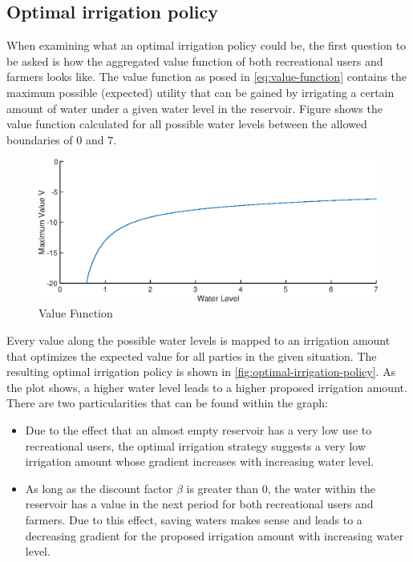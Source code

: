 \documentclass[12pt, a4paper, oneside]{article}
\begin{document}
\subsection{Optimal irrigation policy}
When examining what an optimal irrigation policy could be, the first question to be asked is how the aggregated value function of both recreational users and farmers looks like. 
The value function as posed in \ref{eq:value-function} contains the maximum possible (expected) utility that can be gained by irrigating a certain amount of water under a given water level in the reservoir. 
Figure  shows the value function calculated for all possible water levels between the allowed boundaries of $0$ and $7$. 
\begin{figure}[ht]
	\includegraphics[width=1\textwidth]{figures/value_function.eps}
	\caption{Value Function}
	\label{fig:value-function}
\end{figure}
\newline
Every value along the possible water levels is mapped to an irrigation amount that optimizes the expected value for all parties in the given situation. 
The resulting optimal irrigation policy is shown in \ref{fig:optimal-irrigation-policy}. 
As the plot shows, a higher water level leads to a higher proposed irrigation amount. There are two particularities that can be found within the graph:
\begin{itemize}
	\item Due to the effect that an almost empty reservoir has a very low use to recreational users, the optimal irrigation strategy suggests a very low irrigation amount whose gradient increases with increasing water level.
	\item As long as the discount factor $\beta$ is greater than $0$, the water within the reservoir has a value in the next period for both recreational users and farmers. Due to this effect, saving waters makes sense and leads to a decreasing gradient for the proposed irrigation amount with increasing water level.
\end{itemize}
\end{document}
